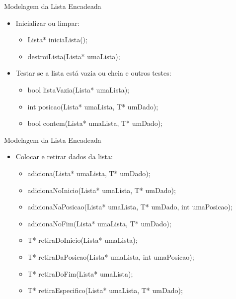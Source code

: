 \documentclass[12pt,table,xcolor={dvipsnames}]{beamer}
\begin{document}
\begin{frame}[fragile]{Modelagem da Lista Encadeada}

\begin{itemize}
\item Inicializar ou limpar:
\begin{itemize}
\item Lista* iniciaLista();
\item destroiLista(Lista* umaLista);
\end{itemize}
\item Testar se a lista está vazia ou cheia e outros testes:
\begin{itemize}
\item bool listaVazia(Lista* umaLista);
\item int posicao(Lista* umaLista, T* umDado);
\item bool contem(Lista* umaLista, T* umDado);
\end{itemize}
\end{itemize}
\end{frame}

\begin{frame}[fragile]{Modelagem da Lista Encadeada}

\begin{itemize}
\item Colocar e retirar dados da lista:
\begin{itemize}
\item adiciona(Lista* umaLista, T* umDado);
\item adicionaNoInicio(Lista* umaLista, T* umDado);
\item adicionaNaPosicao(Lista* umaLista, T* umDado, int umaPosicao);
\item adicionaNoFim(Lista* umaLista, T* umDado);
\item T* retiraDoInicio(Lista* umaLista);
\item T* retiraDaPosicao(Lista* umaLista, int umaPosicao);
\item T* retiraDoFim(Lista* umaLista);
\item T* retiraEspecifico(Lista* umaLista, T* umDado);
\end{itemize}
\end{itemize}
\end{frame}
\end{document}
